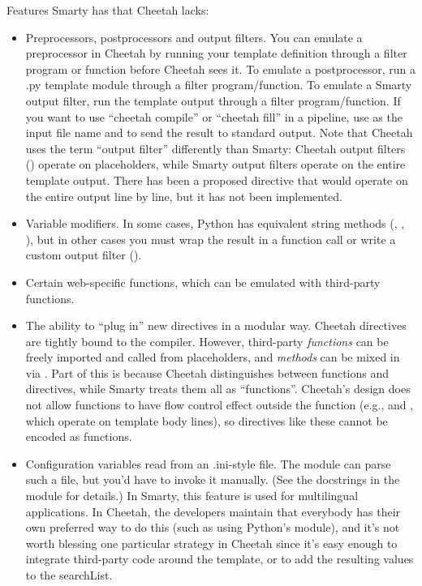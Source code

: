 Features Smarty has that Cheetah lacks:
\begin{itemize}
\item Preprocessors, postprocessors and output filters.  You can emulate a
preprocessor in Cheetah by running your template definition through a filter
program or function before Cheetah sees it.  To emulate a postprocessor, run a
.py template module through a filter program/function.  To emulate a Smarty
output filter, run the template output through a filter program/function.  If
you want to use ``cheetah compile'' or ``cheetah fill'' in a pipeline, use
\code{-} as the input file name and  to send the result to
standard output.  Note that Cheetah uses the term ``output filter'' differently
than Smarty: Cheetah output filters () operate on placeholders,
while Smarty output filters operate on the entire template output.  There has
been a proposed  directive that would operate on the entire output
line by line, but it has not been implemented.
\item Variable modifiers.  In some cases, Python has equivalent string
methods (, , ),
but in other cases you must wrap the result in a function call or write
a custom output filter ().
\item Certain web-specific functions, which can be emulated with 
third-party functions.
\item The ability to ``plug in'' new directives in a modular way.  Cheetah
directives are tightly bound to the compiler.  However, third-party
{\em functions} can be freely imported and called from placeholders, and
{\em methods} can be mixed in via .  Part of this is 
because Cheetah distinguishes between functions and directives, while
Smarty treats them all as ``functions''.  Cheetah's design does not
allow functions to have flow control effect outside the function 
(e.g.,  and , which operate on template body lines),
so directives like these cannot be encoded as functions.
\item Configuration variables read from an .ini-style file.  The 
 module can parse such a file, but you'd
have to invoke it manually.  (See the docstrings in the module for
details.)  In Smarty, this feature is used for 
multilingual applications.  In Cheetah, the developers maintain that everybody
has their own preferred way to do this (such as using Python's 
module), and it's not worth blessing one particular strategy in Cheetah since
it's easy enough to integrate third-party code around the template, or to add
the resulting values to the searchList.
\end{itemize}

